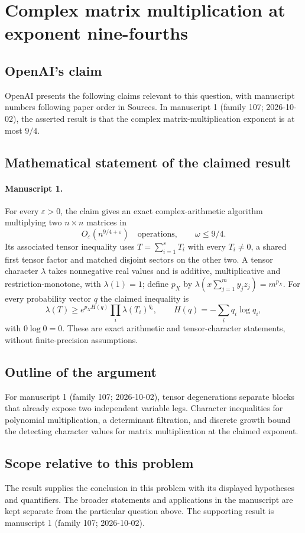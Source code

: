 \documentclass[11pt]{article}
\begin{document}
\section*{Complex matrix multiplication at exponent nine-fourths}

\subsection{OpenAI's claim}
OpenAI presents the following claims relevant to this question, with manuscript numbers following paper order in Sources. In manuscript 1 (family 107; 2026-10-02), the asserted result is that the complex matrix-multiplication exponent is at most $9/4$.

\subsection{Mathematical statement of the claimed result}
\paragraph{Manuscript 1.}
For every $\varepsilon>0$, the claim gives an exact complex-arithmetic algorithm multiplying two $n\times n$ matrices in
\[
 O_{\varepsilon}(n^{9/4+\varepsilon})\quad\text{operations},\qquad\omega\le9/4.
\]
Its associated tensor inequality uses $T=\sum_{i=1}^sT_i$ with every $T_i\ne0$, a shared first tensor factor and matched disjoint sectors on the other two. A tensor character $\lambda$ takes nonnegative real values and is additive, multiplicative and restriction-monotone, with $\lambda(1)=1$; define $p_X$ by $\lambda(x\sum_{j=1}^my_jz_j)=m^{p_X}$. For every probability vector $q$ the claimed inequality is
\[
 \lambda(T)\ge e^{p_XH(q)}\prod_i\lambda(T_i)^{q_i},\qquad
 H(q)=-\sum_iq_i\log q_i,
\]
with $0\log0=0$. These are exact arithmetic and tensor-character statements, without finite-precision assumptions.

\subsection{Outline of the argument}
For manuscript 1 (family 107; 2026-10-02), tensor degenerations separate blocks that already expose two independent variable legs. Character inequalities for polynomial multiplication, a determinant filtration, and discrete growth bound the detecting character values for matrix multiplication at the claimed exponent.

\subsection{Scope relative to this problem}
The result supplies the conclusion in this problem with its displayed hypotheses and quantifiers. The broader statements and applications in the manuscript are kept separate from the particular question above. The supporting result is manuscript 1 (family 107; 2026-10-02).
\end{document}
